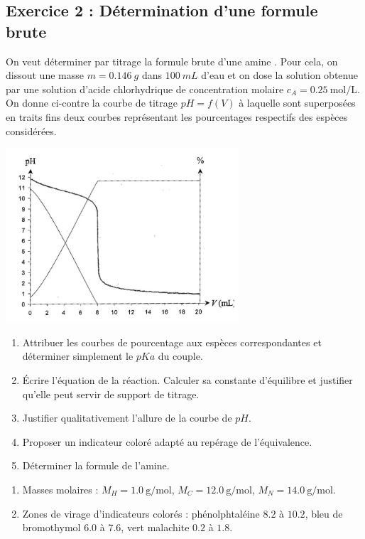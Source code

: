 \subsection{Exercice 2 : Détermination d'une formule brute}

On veut déterminer par titrage la formule brute d'une amine . Pour cela, on dissout une masse $m = \SI{0.146}{g}$ dans $\SI{100}{mL}$ d'eau et on dose la solution obtenue par une solution d'acide chlorhydrique de concentration molaire $c_A = \SI{0.25}{\mol\per\liter}$. On donne ci-contre la courbe de titrage $pH = f(V)$ à laquelle sont superposées en traits fins deux courbes représentant les pourcentages respectifs des espèces considérées.

\includegraphics[width=\textwidth]{./Images/mpsi_s18_ex02.png}

\begin{enumerate}
	\item Attribuer les courbes de pourcentage aux espèces correspondantes et déterminer simplement le $pKa$ du couple.
	\item Écrire l'équation de la réaction. Calculer sa constante d'équilibre et justifier qu'elle peut servir de support de titrage.
	\item Justifier qualitativement l'allure de la courbe de $pH$.
	\item Proposer un indicateur coloré adapté au repérage de l'équivalence.
	\item Déterminer la formule de l'amine.
\end{enumerate}

\begin{enumerate}
	\item Masses molaires : $M_H = \SI{1.0}{\gram\per\mol}$, $M_C = \SI{12.0}{\gram\per\mol}$, $M_N = \SI{14.0}{\gram\per\mol}$.
	\item Zones de virage d'indicateurs colorés : phénolphtaléine $8.2$ à $10.2$, bleu de bromothymol $6.0$ à $7.6$, vert malachite $0.2$ à $1.8$.
\end{enumerate}

